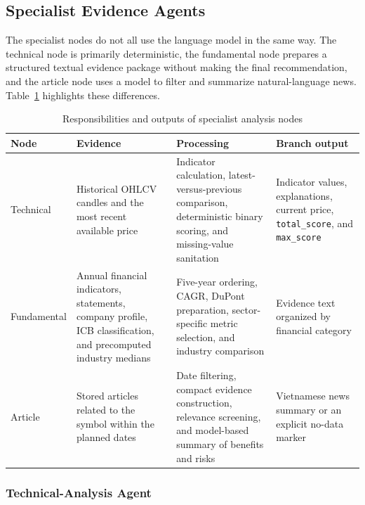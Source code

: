 \subsection{Specialist Evidence Agents}
\label{subsec:analysis-specialist-agents}

The specialist nodes do not all use the language model in the same way. The technical node is primarily deterministic, the fundamental node prepares a structured textual evidence package without making the final recommendation, and the article node uses a model to filter and summarize natural-language news. Table~\ref{tab:specialist-agent-responsibilities} highlights these differences.

\begin{table}[H]
    \centering
    \caption{Responsibilities and outputs of specialist analysis nodes}
    \label{tab:specialist-agent-responsibilities}
    \small
    \setlength{\tabcolsep}{4pt}
    \renewcommand{\arraystretch}{1.2}
    \begin{tabular}{p{2.45cm} p{3.2cm} p{4.8cm} p{2.6cm}}
        \toprule
        \textbf{Node} & \textbf{Evidence} & \textbf{Processing} & \textbf{Branch output} \\
        \midrule
        Technical & Historical OHLCV candles and the most recent available price & Indicator calculation, latest-versus-previous comparison, deterministic binary scoring, and missing-value sanitation & Indicator values, explanations, current price, \texttt{total\_score}, and \texttt{max\_score} \\
        Fundamental & Annual financial indicators, statements, company profile, ICB classification, and precomputed industry medians & Five-year ordering, CAGR, DuPont preparation, sector-specific metric selection, and industry comparison & Evidence text organized by financial category \\
        Article & Stored articles related to the symbol within the planned dates & Date filtering, compact evidence construction, relevance screening, and model-based summary of benefits and risks & Vietnamese news summary or an explicit no-data marker \\
        \bottomrule
    \end{tabular}
\end{table}

\subsubsection{Technical-Analysis Agent}
\label{subsubsec:technical-analysis-agent}

